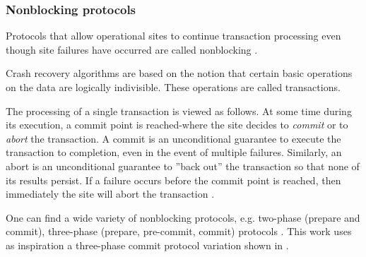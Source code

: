 \subsubsection{Nonblocking protocols}
Protocols that allow operational sites to continue transaction processing even though site failures have occurred are called nonblocking \cite{skeen1981nonblocking}.

Crash recovery algorithms are based on the notion that certain basic operations on the data are logically indivisible. These operations are called transactions.

The processing of a single transaction is viewed as follows. At some time during its execution, a commit point is reached-where the site decides to \textit{commit} or to \textit{abort} the transaction. A commit is an unconditional guarantee to execute the transaction to completion, even in the event of multiple failures. Similarly, an abort is an unconditional guarantee to ''back out'' the transaction so that none of its results persist. If a failure occurs before the commit point is reached, then immediately the site will abort the transaction \cite{skeen1981nonblocking}.

One can find a wide variety of nonblocking protocols, e.g. two-phase (prepare and commit), three-phase (prepare, pre-commit, commit) protocols \cite{skeen1981nonblocking}. This work uses as inspiration a three-phase commit protocol variation shown in \cite{guerraoui2002non}.

 